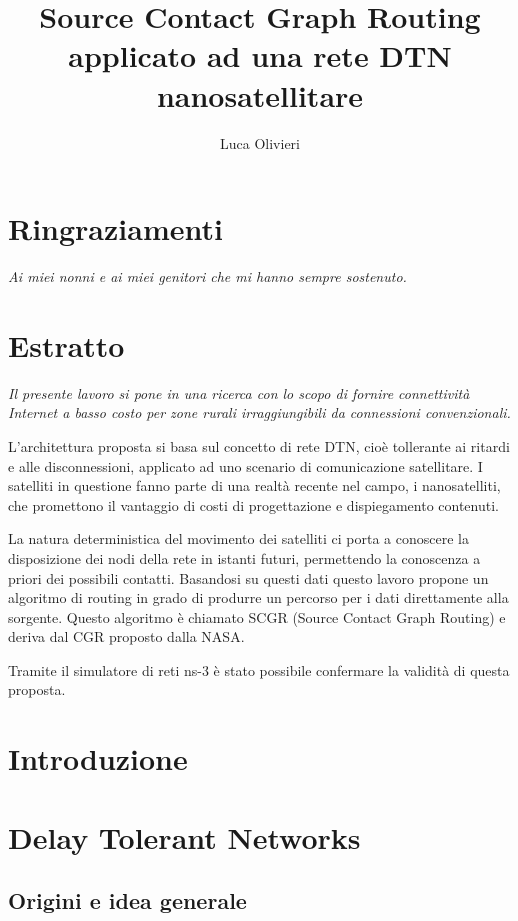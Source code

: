 \documentclass[12pt,a4paper,oneside]{book}
\author{Luca Olivieri}
\title{Source Contact Graph Routing applicato ad una rete DTN nanosatellitare}
\begin{document}
	
	
	
	\clearpage
	
	\chapter*{Ringraziamenti}	
	\textit{Ai miei nonni e ai miei genitori che mi hanno sempre sostenuto.}
	\clearpage
	
	\chapter*{Estratto}
	{ \it Il presente lavoro si pone in una ricerca con lo scopo di fornire connettività Internet a basso costo per zone rurali irraggiungibili da connessioni convenzionali.
	
	L'architettura proposta si basa sul concetto di rete DTN, cioè tollerante ai ritardi e alle disconnessioni, applicato ad uno scenario di comunicazione satellitare. I satelliti in questione fanno parte di una realtà recente nel campo, i nanosatelliti, che promettono il vantaggio di costi di progettazione e dispiegamento contenuti.
	
	La natura deterministica del movimento dei satelliti ci porta a conoscere la disposizione dei nodi della rete in istanti futuri, permettendo la conoscenza a priori dei possibili contatti.
	Basandosi su questi dati questo lavoro propone un algoritmo di routing in grado di produrre un percorso per i dati direttamente alla sorgente. Questo algoritmo è chiamato SCGR (Source Contact Graph Routing) e deriva dal CGR proposto dalla NASA.
	
	Tramite il simulatore di reti ns-3 è stato possibile confermare la validità di questa proposta.}
	\clearpage
	
	\tableofcontents
	
	\clearpage
	
	\chapter{Introduzione}
	
	\clearpage
	
	\chapter{Delay Tolerant Networks}
		
		\section{Origini e idea generale}
		
\end{document}
